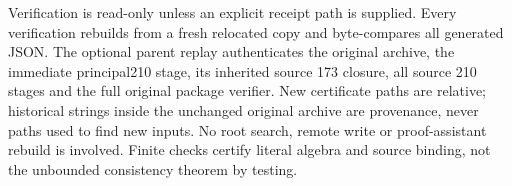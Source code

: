 Verification is read-only unless an explicit receipt path is supplied.
Every verification rebuilds from a fresh relocated copy and
byte-compares all generated JSON. The optional parent replay
authenticates the original archive, the immediate principal210 stage,
its inherited source 173 closure, all source 210 stages and the full
original package verifier. New certificate paths are relative;
historical strings inside the unchanged original archive are provenance,
never paths used to find new inputs. No root search, remote write or
proof-assistant rebuild is involved. Finite checks certify literal
algebra and source binding, not the unbounded consistency theorem by
testing.
